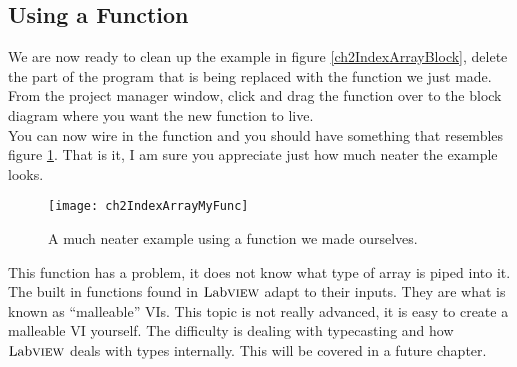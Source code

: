 \subsection{Using a Function}
We are now ready to clean up the example in figure \ref{ch2IndexArrayBlock}, delete the part of the program that is being replaced with the function we just made. From the project manager window, click and drag the function over to the block diagram where you want the new function to live.\\

You can now wire in the function and you should have something that resembles figure \ref{ch2IndexArrayMyFunc}. That is it, I am sure you appreciate just how much neater the example looks.\\
\begin{figure}
	\centering
	\texttt{[image: ch2IndexArrayMyFunc]}
	\caption{A much neater example using a function we made ourselves.}
	\label{ch2IndexArrayMyFunc}
\end{figure}

This function has a problem, it does not know what type of array is piped into it. The built in functions found in $\text{Lab}\textsc{view}$ adapt to their inputs. They are what is known as ``malleable'' VIs. This topic is not really advanced, it is easy to create a malleable VI yourself. The difficulty is dealing with typecasting and how $\text{Lab}\textsc{view}$ deals with types internally. This will be covered in a future chapter.
 \newpage

